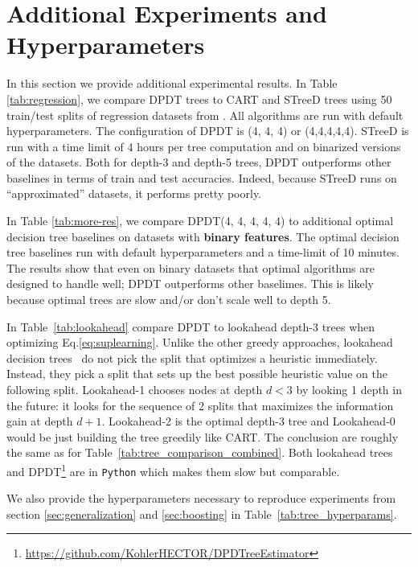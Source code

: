 \section{Additional Experiments and Hyperparameters}
In this section we provide additional experimental results. In Table \ref{tab:regression}, we compare DPDT trees to CART and STreeD trees using 50 train/test splits of regression datasets from \cite{grinsztajn2022tree}. All algorithms are run with default hyperparameters. 
\vfill\eject
The configuration of DPDT is (4, 4, 4) or (4,4,4,4,4). STreeD is run with a time limit of 4 hours per tree computation and on binarized versions of the datasets. 
Both for depth-3 and depth-5 trees, DPDT outperforms other baselines in terms of train and test accuracies. Indeed, because STreeD runs on ``approximated'' datasets, it performs pretty poorly. 

In Table \ref{tab:more-res}, we compare DPDT(4, 4, 4, 4, 4) to additional optimal decision tree baselines on datasets with \textbf{binary features}. The optimal decision tree baselines run with default hyperparameters and a time-limit of 10 minutes. The results show that even on binary datasets that optimal algorithms are designed to handle well; DPDT outperforms other baselimes. This is likely because optimal trees are slow and/or don't scale well to depth 5.

In Table~\ref{tab:lookahead} compare DPDT to lookahead depth-3 trees when optimizing Eq.\ref{eq:suplearning}. Unlike the other greedy approaches, lookahead decision trees~\cite{norton} do not pick the split that optimizes a heuristic immediately. Instead, they pick a split that sets up the best possible heuristic value on the following split. Lookahead-1 chooses nodes at depth $d<3$ by looking 1 depth in the future: it looks for the sequence of 2 splits that maximizes the information gain at depth $d + 1$. Lookahead-2 is the optimal depth-3 tree and Lookahead-0 would be just building the tree greedily like CART. The conclusion are roughly the same as for Table~\ref{tab:tree_comparison_combined}. Both lookahead trees and DPDT\footnote{\url{https://github.com/KohlerHECTOR/DPDTreeEstimator}} are in \texttt{Python} which makes them slow but comparable.

We also provide the hyperparameters necessary to reproduce experiments from section \ref{sec:generalization} and \ref{sec:boosting} in Table~\ref{tab:tree_hyperparams}.


